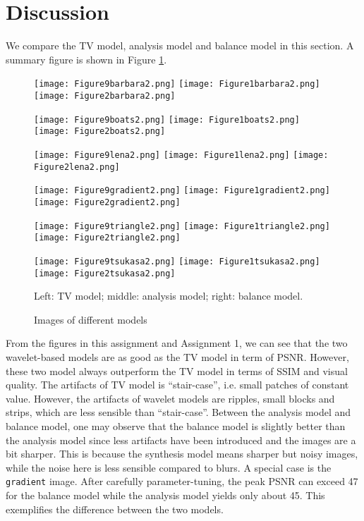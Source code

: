 \documentclass[english, nochinese]{pnote}
\begin{document}
\section{Discussion}

We compare the TV model, analysis model and balance model in this section. A summary figure is shown in Figure \ref{Fig:Sum}.

\begin{figure}[htbp]
{
\centering

\texttt{[image: Figure9barbara2.png]}
\texttt{[image: Figure1barbara2.png]}
\texttt{[image: Figure2barbara2.png]}

\texttt{[image: Figure9boats2.png]}
\texttt{[image: Figure1boats2.png]}
\texttt{[image: Figure2boats2.png]}

\texttt{[image: Figure9lena2.png]}
\texttt{[image: Figure1lena2.png]}
\texttt{[image: Figure2lena2.png]}

\texttt{[image: Figure9gradient2.png]}
\texttt{[image: Figure1gradient2.png]}
\texttt{[image: Figure2gradient2.png]}

\texttt{[image: Figure9triangle2.png]}
\texttt{[image: Figure1triangle2.png]}
\texttt{[image: Figure2triangle2.png]}

\texttt{[image: Figure9tsukasa2.png]}
\texttt{[image: Figure1tsukasa2.png]}
\texttt{[image: Figure2tsukasa2.png]}

\caption{Images of different models}
\label{Fig:Sum}
}
{
\footnotesize Left: TV model; middle: analysis model; right: balance model.
}
\end{figure}

From the figures in this assignment and Assignment 1, we can see that the two wavelet-based models are as good as the TV model in term of PSNR. However, these two model always outperform the TV model in terms of SSIM and visual quality. The artifacts of TV model is ``stair-case'', i.e. small patches of constant value. However, the artifacts of wavelet models are ripples, small blocks and strips, which are less sensible than ``stair-case''. Between the analysis model and balance model, one may observe that the balance model is slightly better than the analysis model since less artifacts have been introduced and the images are a bit sharper. This is because the synthesis model means sharper but noisy images, while the noise here is less sensible compared to blurs. A special case is the \verb"gradient" image. After carefully parameter-tuning, the peak PSNR can exceed 47 for the balance model while the analysis model yields only about 45. This exemplifies the difference between the two models.
\end{document}
